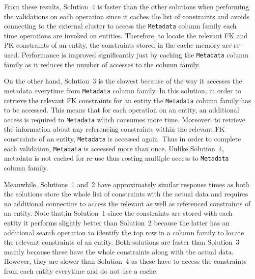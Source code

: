 From these results, Solution~4  is faster than the other solutions when
performing the validations on each operation since it caches the list of
constraints and avoids connecting to the external cluster to access the
\texttt{Metadata} column family each time  operations are invoked on entities.
Therefore, to locate the relevant \ac{FK} and \ac{PK} constraints of an entity,
the constraints stored in the cache memory are re-used.
Performance is improved significantly just by caching the 
\texttt{Metadata} column family as it reduces the number of accesses to the
column family.

On the other hand, Solution~3 is the slowest  because of the
way it accesses the metadata everytime from \texttt{Metadata} column family.
In this solution, in order to retrieve the relevant \ac{FK} constraints for
an entity the \texttt{Metadata} column family has to be accessed. This means
that for each operation on an entity, an additional access is required to
\texttt{Metadata} which consumes more time.
Moreover, to retrieve the information about any referencing constraints within
the relevant \ac{FK} constraints of an entity, \texttt{Metadata} is accessed
again.
Thus in order to
complete each validation, \texttt{Metadata} is accessed more than once.
Unlike Solution~4, metadata is not cached for re-use thus costing multiple
access to \texttt{Metadata} column family.

Meanwhile, Solutions~1 and~2 have approximately similar response times as both
the solutions store the whole list of constraints with the actual data and 
requires no additional connectins to access the relevant as well as
referenced constraints of an entity. Note that,in Solution~1 since the constraints
are stored with each entity it performs slightly better than
Solution~2 because the latter has an additional search operation to identify the
top row in a column family to locate the relevant constraints of an entity. Both
solutions are faster than Solution~3 mainly because these have the whole
constraints along with the actual data. However, they are slower than Solution~4
as these have to access the constraints from each entity everytime and do not
use a cache.



